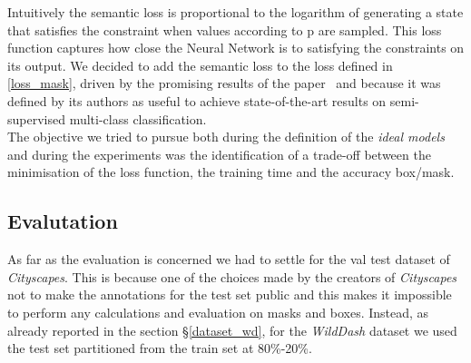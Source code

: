 \documentclass[10pt,twocolumn,letterpaper]{article}
\begin{document}
\noindent
Intuitively the semantic loss is proportional to the logarithm of generating a state that satisfies the constraint when values according to p are sampled. This loss function captures how close the Neural Network is to satisfying the constraints on its output. We decided to add the semantic loss to the loss defined in \ref{loss_mask}, driven by the promising results of the paper~\cite{Authors2_BlendMask} and because it was defined by its authors as useful to achieve state-of-the-art results on semi-supervised multi-class classification. \\
The objective we tried to pursue both during the definition of the \textit{ideal models} and during the experiments was the identification of a trade-off between the minimisation of the loss function, the training time and the accuracy box/mask.
\subsection{Evalutation}
As far as the evaluation is concerned we had to settle for the val test dataset of \textit{Cityscapes}. 
This is because one of the choices made by the creators of \textit{Cityscapes}~\cite{cityscapes} not to make the annotations for the test set public and this makes it impossible to perform any calculations and evaluation on masks and boxes. Instead, as already reported in the section  \S\ref{dataset_wd}, for the \textit{WildDash} dataset we used the test set partitioned from the train set at 80\%-20\%.
\end{document}
